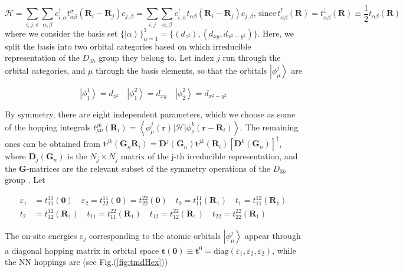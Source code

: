 \begin{equation}
\mathcal{H} = \sum_{i, j, \sigma} \sum_{\alpha, \beta} c_{i,\alpha}^\dagger t_{\alpha \beta}^\sigma ( \bm R_i - \bm R_j ) c_{j, \beta} = \sum_{i, j} \sum_{\alpha, \beta} c_{i,\alpha}^\dagger t_{\alpha \beta} ( \bm R_i - \bm R_j ) c_{j, \beta} , \, \text{since} \,  t_{\alpha \beta}^\uparrow ( \bm R )  = t_{\alpha \beta}^\downarrow ( \bm R ) \equiv \frac{1}{2} t_{\alpha \beta} ( \bm R )
\end{equation}
where we consider the basis set $\{ \left| \alpha \right\rangle \}_{\alpha = 1}^3 = \{ (d_{z^2}) , (d_{x y}, d_{ x^2 - y^2 }) \} $.
Here, we split the basis into two orbital categories based on which irreducible representation of the $D_{3h}$ group they belong to.
Let index $j$ run through the orbital categories, and $\mu$ through the basis elements, so that the orbitals $\left| \phi_\mu^j \right\rangle$ are

\begin{equation}
\left| \phi_1^1 \right\rangle = d_{z^2} \quad \left| \phi_1^2 \right\rangle = d_{xy} \quad \left| \phi_2^2 \right\rangle = d_{x^2 - y^2} 
\end{equation}

By symmetry, there are eight independent parameters, which we choose as some of the hopping integrals $t_{\mu \nu}^{j k} ( \bm R_i ) = \left\langle \phi_\mu^j ( \bm r ) | \mathcal{H} | \phi_{\nu}^k ( \bm r - \bm R_i ) \right\rangle$.
The remaining ones can be obtained from $\bm t^{jk} ( \bm G_n \bm R_i ) = \bm D^j ( \bm G_n ) \bm t^{j k} ( \bm R_i ) [ \bm D^k ( \bm G_n ) ]^\dagger$, where $\bm D_j ( \bm G_n )$ is the $N_j \times N_j$ matrix of the j-th irreducible representation, and the $\bm G$-matrices are the relevant subset of the symmetry operations of the $D_{3h}$ group \cite{braz_electronic_2015,liu_three-band_2013}.
Let 

\begin{equation}
\begin{split}
\varepsilon_1 &= t_{11}^{11} ( \bm 0 ) \quad \varepsilon_2 = t_{22}^{11} ( \bm 0 ) = t_{22}^{22} ( \bm 0 ) \quad t_0 = t_{11}^{11} ( \bm R_1 ) \quad t_1 = t_{11}^{12} ( \bm R_1 ) \\
t_2 &= t_{12}^{12} ( \bm R_1 ) \quad t_{11} = t_{11}^{22} ( \bm R_1 ) \quad t_{12} = t_{12}^{22} ( \bm R_1 ) \quad t_{22} = t_{22}^{22} ( \bm R_1 )
\end{split}
\end{equation}

The on-site energies $\varepsilon_j$ corresponding to the atomic orbitals $\left| \phi_\mu^j \right\rangle$ appear through a diagonal hopping matrix in orbital space $\bm t ( \bm 0 ) \equiv \bm t^0 = \text{diag} ( \varepsilon_1, \varepsilon_2, \varepsilon_2 )$, while the NN hoppings are (see Fig.(\ref{fig:tmdHex}))

